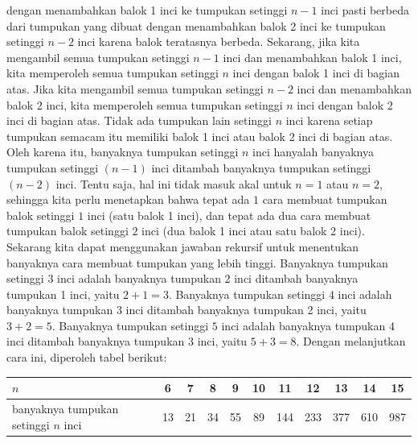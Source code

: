 \begin{description}
dengan menambahkan balok 1 inci ke tumpukan setinggi $n-1$ inci pasti
berbeda dari tumpukan yang dibuat dengan menambahkan balok 2 inci
ke tumpukan setinggi $n-2$ inci karena balok teratasnya berbeda.
Sekarang, jika kita mengambil semua tumpukan setinggi $n-1$ inci
dan menambahkan balok 1 inci, kita memperoleh semua tumpukan setinggi
$n$ inci dengan balok 1 inci di bagian atas. Jika kita mengambil
semua tumpukan setinggi $n-2$ inci dan menambahkan balok 2 inci,
kita memperoleh semua tumpukan setinggi $n$ inci dengan balok 2 inci
di bagian atas. Tidak ada tumpukan lain setinggi $n$ inci karena
setiap tumpukan semacam itu memiliki balok 1 inci atau balok 2 inci
di bagian atas. Oleh karena itu, banyaknya tumpukan setinggi $n$
inci hanyalah banyaknya tumpukan setinggi $(n-1)$ inci ditambah banyaknya
tumpukan setinggi $(n-2)$ inci. Tentu saja, hal ini tidak masuk akal
untuk $n=1$ atau $n=2$, sehingga kita perlu menetapkan bahwa tepat
ada $1$ cara membuat tumpukan balok setinggi $1$ inci (satu balok
1 inci), dan tepat ada dua cara membuat tumpukan balok setinggi $2$
inci (dua balok 1 inci atau satu balok 2 inci). Sekarang kita dapat
menggunakan jawaban rekursif untuk menentukan banyaknya cara membuat
tumpukan yang lebih tinggi. Banyaknya tumpukan setinggi $3$ inci
adalah banyaknya tumpukan 2 inci ditambah banyaknya tumpukan 1 inci,
yaitu $2+1=3$. Banyaknya tumpukan setinggi $4$ inci adalah banyaknya
tumpukan 3 inci ditambah banyaknya tumpukan 2 inci, yaitu $3+2=5$.
Banyaknya tumpukan setinggi $5$ inci adalah banyaknya tumpukan 4
inci ditambah banyaknya tumpukan 3 inci, yaitu $5+3=8$. Dengan melanjutkan
cara ini, diperoleh tabel berikut:

\begin{center}
\begin{tabular}{>{\centering}p{2.5cm}|cccccccccc}
$n$ & 6 & 7 & 8 & 9 & 10 & 11 & 12 & 13 & 14 & 15\tabularnewline
\hline 
banyaknya tumpukan setinggi $n$ inci & 13 & 21 & 34 & 55 & 89 & 144 & 233 & 377 & 610 & 987\tabularnewline
\end{tabular}
\par\end{center}
\end{description}

